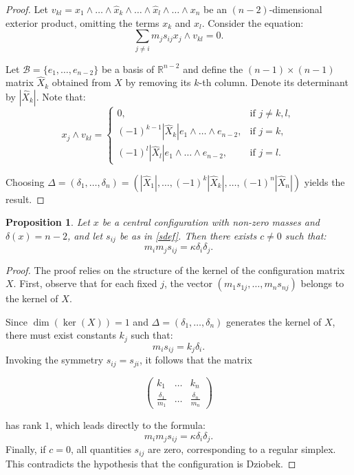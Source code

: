\documentclass{amsart}
\newtheorem{proposition}[theorem]{Proposition}
\theoremstyle{definition}
\theoremstyle{remark}
\numberwithin{equation}{section}
\begin{document}
\begin{proof}
Let $v_{kl} = x_1 \wedge \dots \wedge \widehat{x}_k \wedge \dots \wedge \widehat{x}_l \wedge \dots \wedge x_n$ be an $(n-2)$-dimensional exterior product, omitting the terms $x_k$ and $x_l$. Consider the equation:
\[
\sum_{j \neq i} m_j s_{ij} x_j \wedge v_{kl} = 0.
\]

Let $\mathcal{B}=\{e_1, \dots, e_{n-2}\}$ be a basis of $\mathbb{R}^{n-2}$ and define the $(n-1)\times(n-1)$ matrix $\hat{X}_k$ obtained from $X$ by removing its $k$-th column. Denote its determinant by $|\hat{X}_k|$. Note that:
\[
x_j \wedge v_{kl}=\begin{cases}
      0, & \text{if } j\neq k,l,\\
      (-1)^{k-1}|\hat{X}_k| e_1\wedge \dots \wedge e_{n-2}, & \text{if } j=k,\\
      (-1)^{l}|\hat{X}_l| e_1\wedge \dots \wedge e_{n-2}, & \text{if } j=l.
\end{cases}
\]

Choosing $\Delta=(\delta_1, \dots, \delta_n) = (|\hat{X}_1|, \dots, (-1)^k|\hat{X}_k|, \dots, (-1)^n|\hat{X}_{n}|)$ yields the result.
\end{proof}

\begin{proposition}\label{dizeq}
Let $x$ be a central configuration with non-zero masses and $\delta(x) = n-2$, and let $s_{ij}$ be as in \eqref{sdef}. Then there exists $c \neq 0$ such that:
\begin{equation}
    m_im_js_{ij} = \kappa \delta_i \delta_j.
\end{equation}
\end{proposition}

\begin{proof}
The proof relies on the structure of the kernel of the configuration matrix $X$. First, observe that for each fixed $j$, the vector $(m_1 s_{1j}, \dots, m_n s_{nj})$ belongs to the kernel of $X$.

Since $\dim(\ker(X))=1$ and $\Delta=(\delta_1, \dots, \delta_n)$ generates the kernel of $X$, there must exist constants $k_j$ such that:
\[
m_i s_{ij} = k_j \delta_i.
\]
Invoking the symmetry $s_{ij} = s_{ji}$, it follows that the  matrix

$$\begin{pmatrix}
    k_1 & \dots & k_n \\
    \frac{\delta_1}{m_1} & \dots & \frac{\delta_n}{m_n}
\end{pmatrix}$$

has rank $1$, which leads directly to the formula:
\[
m_i m_j s_{ij} = \kappa \delta_i \delta_j.
\]
Finally, if $c=0$, all quantities $s_{ij}$ are zero, corresponding to a regular simplex. This contradicts the hypothesis that the configuration is Dziobek.
\end{proof}
\end{document}
